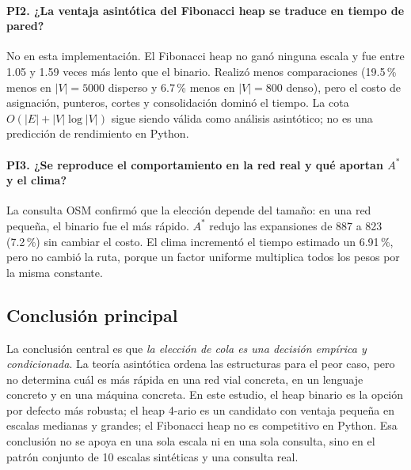 \paragraph{PI2. ¿La ventaja asintótica del Fibonacci heap se traduce en tiempo de pared?} No en esta implementación. El Fibonacci heap no ganó ninguna escala y fue entre 1.05 y 1.59 veces más lento que el binario. Realizó menos comparaciones (19.5\,\% menos en $|V|=5000$ disperso y 6.7\,\% menos en $|V|=800$ denso), pero el costo de asignación, punteros, cortes y consolidación dominó el tiempo. La cota $O(|E|+|V|\log|V|)$ sigue siendo válida como análisis asintótico; no es una predicción de rendimiento en Python.

\paragraph{PI3. ¿Se reproduce el comportamiento en la red real y qué aportan $A^*$ y el clima?} La consulta OSM confirmó que la elección depende del tamaño: en una red pequeña, el binario fue el más rápido. $A^*$ redujo las expansiones de 887 a 823 (7.2\,\%) sin cambiar el costo. El clima incrementó el tiempo estimado un 6.91\,\%, pero no cambió la ruta, porque un factor uniforme multiplica todos los pesos por la misma constante.

\subsection{Conclusión principal}
La conclusión central es que \emph{la elección de cola es una decisión empírica y condicionada}. La teoría asintótica ordena las estructuras para el peor caso, pero no determina cuál es más rápida en una red vial concreta, en un lenguaje concreto y en una máquina concreta. En este estudio, el heap binario es la opción por defecto más robusta; el heap 4-ario es un candidato con ventaja pequeña en escalas medianas y grandes; el Fibonacci heap no es competitivo en Python. Esa conclusión no se apoya en una sola escala ni en una sola consulta, sino en el patrón conjunto de 10 escalas sintéticas y una consulta real.

